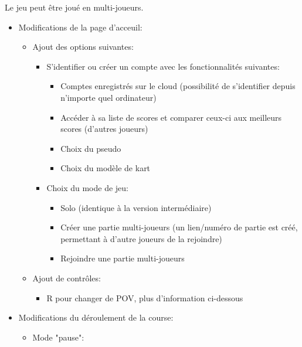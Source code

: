 \documentclass{article}
\begin{document}
Le jeu peut être joué en multi-joueurs.
\begin{itemize}
    \item Modifications de la page d'acceuil: \begin{itemize}
              \item Ajout des options suivantes: \begin{itemize}
                        \item S'identifier ou créer un compte avec les fonctionnalités suivantes: \begin{itemize}
                                  \item Comptes enregistrés sur le cloud (possibilité de s'identifier depuis n'importe quel ordinateur)
                                  \item Accéder à sa liste de scores et comparer ceux-ci aux meilleurs scores (d'autres joueurs)
                                  \item Choix du pseudo
                                  \item Choix du modèle de kart
                              \end{itemize}
                        \item Choix du mode de jeu: \begin{itemize}
                                  \item Solo (identique à la version intermédiaire)
                                  \item Créer une partie multi-joueurs (un lien/numéro de partie est créé, permettant à d'autre joueurs de la rejoindre)
                                  \item Rejoindre une partie multi-joueurs
                              \end{itemize}
                    \end{itemize}
              \item Ajout de contrôles: \begin{itemize}
                        \item R pour changer de POV, plus d'information ci-dessous
                    \end{itemize}
          \end{itemize}
    \item Modifications du déroulement de la course: \begin{itemize}
              \item Mode "pause": \begin{itemize}

\end{itemize}
\end{itemize}
\end{itemize}
\end{document}
